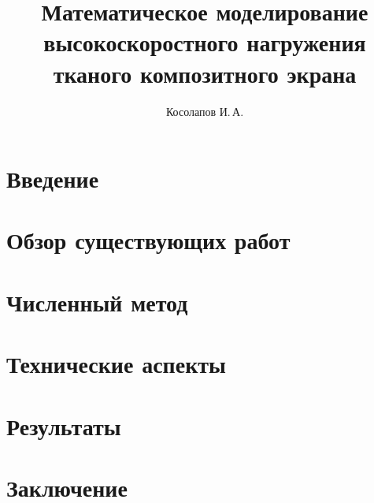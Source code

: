 \documentclass{mipt-thesis-bs}
\title{Математическое моделирование высокоскоростного нагружения тканого композитного экрана}
\author{Косолапов И.\,А.}
\begin{document}
  \frontmatter
  \titlecontents

  \chapter{Введение}\label{ch:intro}

  \chapter{Обзор существующих работ}\label{ch:overview}

  \chapter{Численный метод}\label{ch:nummethod}

  \chapter{Технические аспекты}\label{ch:architecture}

  \chapter{Результаты}\label{ch:results}

  \chapter{Заключение}\label{ch:conclusion}
\end{document}
